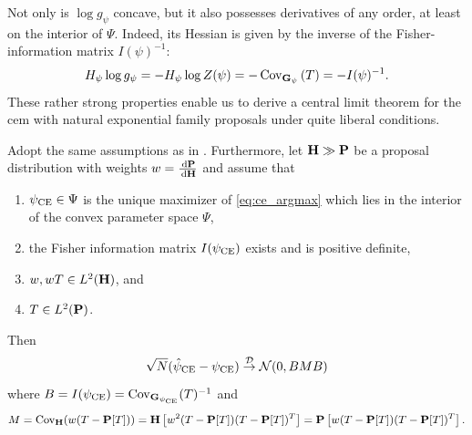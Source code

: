 Not only is $\log g_{\psi}$ concave, but it also possesses derivatives of any order, at least on the interior of $\Psi$. Indeed, its Hessian is given by the inverse of the Fisher-information matrix $I(\psi)^{-1}$:
$$
H_{\psi} \log g_{\psi} = - H_{\psi} \log Z (\psi) = - \cov_{\G_{\psi}} \left(T\right) = -I(\psi)^{-1}.
$$
These rather strong properties enable us to derive a central limit theorem for the \gls{cem} with natural exponential family proposals under quite liberal conditions.

\begin{theorem}
    \label{thm:cem-clt}
    Adopt the same assumptions as in . Furthermore, let $\H \gg \P$ be a proposal distribution with weights $w = \rnd{\P}{\H}$ and assume that
    \begin{enumerate}
        \item\label{it:pceinterior} $\pce \in \Psi$ is the unique maximizer of \eqref{eq:ce_argmax} which lies in the interior of the convex parameter space $\Psi$, 
        \item\label{it:FIMspd} the Fisher information matrix $I(\pce)$ exists and is positive definite,
        \item\label{it:wTinL2G} $w,wT \in L^{2}(\H)$, and 
        \item\label{it:TinL2P} $T\in L^{2}(\P)$.
    \end{enumerate}
    
    Then 
    $$
        \sqrt{N}(\hpce - \pce) \convD \Normal (0, BMB)
    $$
    where $B = I(\pce) = \cov_{\G_{\pce}} (T)^{-1}$ and $$M = \cov_{\H} (w(T - \P [T])) = \H \left[w^{2} (T - \P[T])(T - \P[T])^{T}\right] = \P \left[ w (T - \P [T]) (T - \P [T])^{T} \right].$$
\end{theorem}

